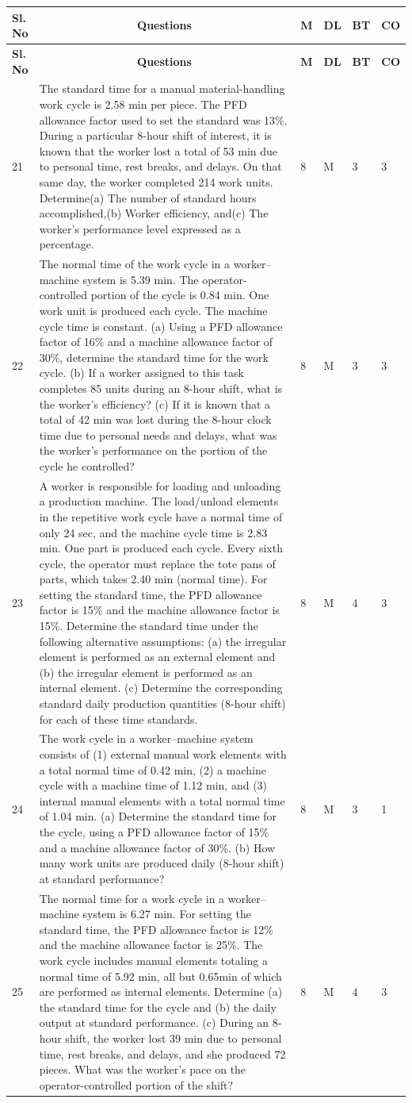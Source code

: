 \documentclass{rvcepaper}
\newenvironment{qbtable}{%
  \begin{longtable}{|C{1.05cm}|p{10.7cm}|C{0.85cm}|C{0.95cm}|C{0.85cm}|C{0.85cm}|}
  \hline \textbf{Sl.\newline No} & \multicolumn{1}{c|}{\textbf{Questions}} & \textbf{M} & \textbf{DL} & \textbf{BT} & \textbf{CO}\\ \hline
  \endfirsthead
  \hline \textbf{Sl.\newline No} & \multicolumn{1}{c|}{\textbf{Questions}} & \textbf{M} & \textbf{DL} & \textbf{BT} & \textbf{CO}\\ \hline
  \endhead
}{\end{longtable}}
\newcommand{\qbrow}[6]{#1 & #2 & #3 & #4 & #5 & #6\\ \hline}
\begin{document}
\begin{iempaper}
\begin{qbtable}
\qbrow{21}{The standard time for a manual material-handling work cycle is 2.58 min per piece. The PFD allowance factor used to set the standard was 13\%. During a particular 8-hour shift of interest, it is known that the worker lost a total of 53 min due to personal time, rest breaks, and delays. On that same day, the worker completed 214 work units. Determine\newline (a) The number of standard hours accomplished,\newline (b) Worker efficiency, and\newline (c) The worker's performance level expressed as a percentage.}{8}{M}{3}{3}
\qbrow{22}{The normal time of the work cycle in a worker--machine system is 5.39 min. The operator-controlled portion of the cycle is 0.84 min. One work unit is produced each cycle. The machine cycle time is constant. (a) Using a PFD allowance factor of 16\% and a machine allowance factor of 30\%, determine the standard time for the work cycle. (b) If a worker assigned to this task completes 85 units during an 8-hour shift, what is the worker's efficiency? (c) If it is known that a total of 42 min was lost during the 8-hour clock time due to personal needs and delays, what was the worker's performance on the portion of the cycle he controlled?}{8}{M}{3}{3}
\qbrow{23}{A worker is responsible for loading and unloading a production machine. The load/unload elements in the repetitive work cycle have a normal time of only 24 sec, and the machine cycle time is 2.83 min. One part is produced each cycle. Every sixth cycle, the operator must replace the tote pans of parts, which takes 2.40 min (normal time). For setting the standard time, the PFD allowance factor is 15\% and the machine allowance factor is 15\%. Determine the standard time under the following alternative assumptions: (a) the irregular element is performed as an external element and (b) the irregular element is performed as an internal element. (c) Determine the corresponding standard daily production quantities (8-hour shift) for each of these time standards.}{8}{M}{4}{3}
\qbrow{24}{The work cycle in a worker--machine system consists of (1) external manual work elements with a total normal time of 0.42 min, (2) a machine cycle with a machine time of 1.12 min, and (3) internal manual elements with a total normal time of 1.04 min. (a) Determine the standard time for the cycle, using a PFD allowance factor of 15\% and a machine allowance factor of 30\%. (b) How many work units are produced daily (8-hour shift) at standard performance?}{8}{M}{3}{1}
\qbrow{25}{The normal time for a work cycle in a worker--machine system is 6.27 min. For setting the standard time, the PFD allowance factor is 12\% and the machine allowance factor is 25\%. The work cycle includes manual elements totaling a normal time of 5.92 min, all but 0.65min of which are performed as internal elements. Determine (a) the standard time for the cycle and (b) the daily output at standard performance. (c) During an 8- hour shift, the worker lost 39 min due to personal time, rest breaks, and delays, and she produced 72 pieces. What was the worker's pace on the operator-controlled portion of the shift?}{8}{M}{4}{3}

\end{qbtable}
\end{iempaper}
\end{document}

